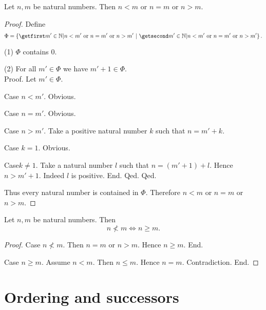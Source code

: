 \documentclass[../arithmetic.tex]{subfiles}
\begin{document}
  \begin{forthel}
    \begin{proposition}
      Let $n, m$ be natural numbers.
      Then $n < m$ or $n = m$ or $n > m$.
    \end{proposition}
    \begin{proof}
      Define \[ \Phi = \class{m' \in \Nat | \text{$n < m'$ or $n = m'$ or
      $n > m'$}}. \]

      (1) $\Phi$ contains $0$.

      (2) For all $m' \in \Phi$ we have $m' + 1 \in \Phi$. \\
      Proof.
        Let $m' \in \Phi$.

        Case $n < m'$. Obvious.

        Case $n = m'$. Obvious.

        Case $n > m'$.
          Take a positive natural number $k$ such that $n = m' + k$.

          Case $k = 1$. Obvious.

          Case$k \neq 1$.
            Take a natural number $l$ such that $n = (m' + 1) + l$.
            Hence $n > m' + 1$.
            Indeed $l$ is positive.
          End.
        Qed.
      Qed.

      Thus every natural number is contained in $\Phi$.
      Therefore $n < m$ or $n = m$ or $n > m$.
    \end{proof}
  \end{forthel}

  \begin{forthel}
    \begin{proposition}
      Let $n, m$ be natural numbers.
      Then \[ n \nless m \iff n \geq m. \]
    \end{proposition}
    \begin{proof}
      Case $n \nless m$.
        Then $n = m$ or $n > m$.
        Hence $n \geq m$.
      End.

      Case $n \geq m$.
        Assume $n < m$.
        Then $n \leq m$.
        Hence $n = m$.
        Contradiction.
      End.
    \end{proof}
  \end{forthel}


  \section{Ordering and successors}
\end{document}

